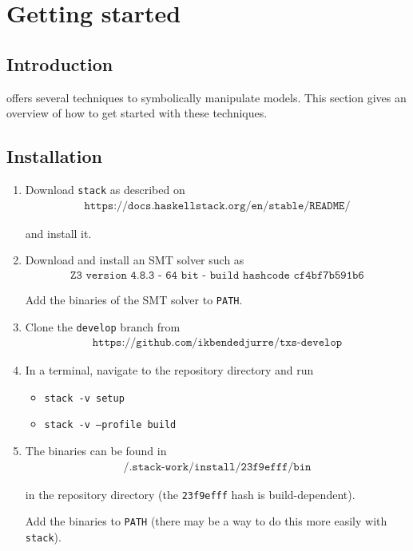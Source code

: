 \chapter{Getting started}

\section{Introduction}

\txs{} offers several techniques to symbolically manipulate \txs{} models.
This section gives an overview of how to get started with these techniques.

\section{Installation}

\begin{enumerate}
\item Download \texttt{stack} as described on
\begin{align*}
\texttt{https://docs.haskellstack.org/en/stable/README/}
\end{align*}

and install it.

\item Download and install an SMT solver such as
\begin{align*}
\texttt{Z3 version 4.8.3 - 64 bit - build hashcode cf4bf7b591b6}
\end{align*}

Add the binaries of the SMT solver to \texttt{PATH}.
\item Clone the \texttt{develop} branch from
\begin{align*}
\texttt{https://github.com/ikbendedjurre/txs-develop}
\end{align*}
\item In a terminal, navigate to the repository directory and run
\begin{itemize}
\item \texttt{stack -v setup}
\item \texttt{stack -v --profile build}
\end{itemize}
\item The \txs{} binaries can be found in
\begin{align*}
\texttt{/.stack-work/install/23f9efff/bin}
\end{align*}

in the repository directory (the \texttt{23f9efff} hash is build-dependent).

Add the binaries to \texttt{PATH} (there may be a way to do this more easily with \texttt{stack}).
\end{enumerate}

